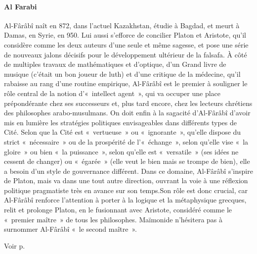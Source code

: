 \paragraph{Al Farabi}   \label{Theo:AlFarabi}
Al-Fârâbî naît en 872, dans l’actuel Kazakhstan, étudie à Bagdad, et meurt à Damas, en Syrie, en 950. Lui aussi s’efforce de concilier Platon et Aristote, qu’il considère comme les deux auteurs d’une seule et même sagesse, et pose une série de nouveaux jalons décisifs pour le développement
ultérieur de la falsafa. À côté de multiples travaux de mathématiques et d’optique, d’un Grand livre de musique (c’était un bon joueur de luth) et d’une critique de la médecine, qu’il rabaisse au rang d’une routine empirique, Al-Fârâbî est le premier à souligner le rôle central de la notion d’« intellect agent », qui va occuper une place prépondérante chez ses successeurs et, plus tard encore, chez les lecteurs chrétiens des philosophes arabo-musulmans. On doit enfin à la sagacité d’Al-Fârâbî d’avoir mis en lumière les stratégies politiques envisageables dans différents types de Cité. Selon que la Cité est « vertueuse » ou « ignorante », qu’elle dispose du strict « nécessaire » ou de la prospérité de l’« échange », selon qu’elle vise « la gloire » ou bien « la puissance », selon qu’elle est « versatile » (ses idées ne cessent de changer) ou « égarée » (elle veut le bien mais se trompe de bien), elle a besoin d’un style de gouvernance différent. Dans ce domaine, Al-Fârâbî s’inspire de Platon, mais va dans une tout autre direction, ouvrant la voie à une réflexion politique pragmatiste très en avance sur son temps.Son rôle est donc crucial, car Al-Fârâbî renforce l’attention à porter à la logique et la métaphysique grecques, relit et prolonge Platon, en le fusionnant avec Aristote, considéré comme le « premier maître » de tous les philosophes. Maïmonide n’hésitera pas à surnommer Al-Fârâbî « le second maître ».

Voir p. \pageref{Theo:AlFarab1}

